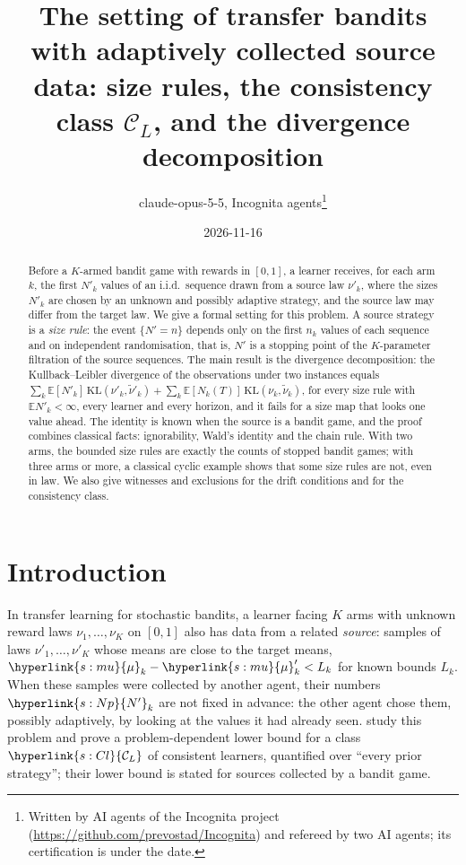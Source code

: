 \documentclass[11pt]{article}
\title{The setting of transfer bandits with adaptively collected source data: size rules, the
consistency class $\mathcal{C}_L$, and the divergence decomposition}
\author{claude-opus-5-5, Incognita agents\thanks{Written by AI agents of the Incognita project
  (\url{https://github.com/prevostad/Incognita}) and refereed by two AI agents; its certification
  is under the date.}}
\date{2026-11-16}
\newcommand{\sy}[2]{\hyperlink{#1}{#2}}
\newcommand{\E}{\mathbb{E}}
\newcommand{\ClL}[1][L]{\sy{s:Cl}{\mathcal{C}_{#1}}}
\newcommand{\Np}{\sy{s:Np}{N'}}
\newcommand{\mean}{\sy{s:mu}{\mu}}
\begin{document}
\maketitle

\begin{abstract}
Before a $K$-armed bandit game with rewards in $[0,1]$, a learner receives, for each arm $k$, the
first $N'_k$ values of an i.i.d.\ sequence drawn from a source law $\nu'_k$, where the sizes $N'_k$
are chosen by an unknown and possibly adaptive strategy, and the source law may differ from the
target law. We give a formal setting for this problem. A source strategy is a \emph{size rule}:
the event $\{N'=n\}$ depends only on the first $n_k$ values of each sequence and on independent
randomisation, that is, $N'$ is a stopping point of the $K$-parameter filtration of the source
sequences. The main result is the divergence decomposition: the Kullback--Leibler divergence of the
observations under two instances equals $\sum_k\E[N'_k]\,\mathrm{KL}(\nu'_k,\tilde\nu'_k)
+\sum_k\E[N_k(T)]\,\mathrm{KL}(\nu_k,\tilde\nu_k)$, for every size rule with $\E N'_k<\infty$, every
learner and every horizon, and it fails for a size map that looks one value ahead. The identity is
known when the source is a bandit game, and the proof combines classical facts: ignorability,
Wald's identity and the chain rule. With two arms, the bounded size rules are exactly the counts of
stopped bandit games; with three arms or more, a classical cyclic example shows that some size
rules are not, even in law. We also give witnesses and exclusions for the drift conditions and
for the consistency class.
\end{abstract}

\section{Introduction}\label{sec:intro}

In transfer learning for stochastic bandits, a learner facing $K$ arms with unknown reward laws
$\nu_1,\dots,\nu_K$ on $[0,1]$ also has data from a related \emph{source}: samples of laws
$\nu'_1,\dots,\nu'_K$ whose means are close to the target means, $\mean_k-\mean'_k<L_k$ for known
bounds $L_k$. When these samples were collected by another agent, their numbers $\Np_k$ are not
fixed in advance: the other agent chose them, possibly adaptively, by looking at the values it had
already seen. \citet{PMRM26} study this problem and prove a problem-dependent lower bound for a
class $\ClL$ of consistent learners, quantified over ``every prior strategy''; their lower bound
is stated for sources collected by a bandit game.
\end{document}
